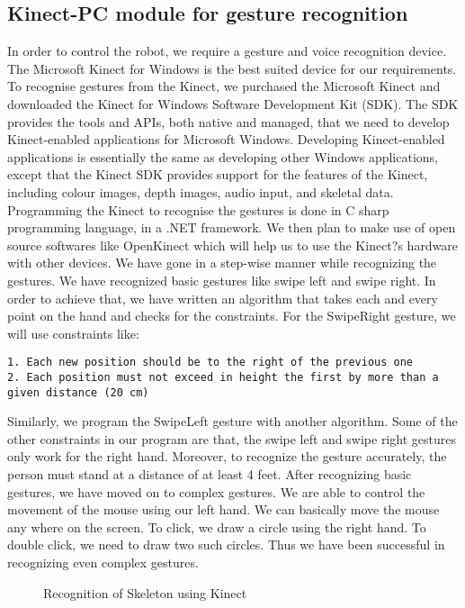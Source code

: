 \subsection{Kinect-PC module for gesture recognition}
In order to control the robot, we require a gesture and voice recognition device. The Microsoft Kinect for Windows is the best suited device for our requirements. To recognise gestures from the Kinect, we purchased the Microsoft Kinect and downloaded the Kinect for Windows Software Development Kit (SDK). The SDK provides the tools and APIs, both native and managed, that we need to develop Kinect-enabled applications for Microsoft Windows.
Developing Kinect-enabled applications is essentially the same as developing other Windows applications, except that the Kinect SDK provides support for the features of the Kinect, including colour images, depth images, audio input, and skeletal data. Programming the Kinect to recognise the gestures is done in C sharp programming language, in a .NET framework. We then plan to make use of open source softwares like OpenKinect which will help us to use the Kinect?s hardware with other devices. We have gone in a step-wise manner while recognizing the gestures. We have recognized basic gestures like swipe left and swipe right. In order to achieve that, we have written an algorithm that takes each and every point on the hand and checks for the constraints.
For the SwipeRight gesture, we will use constraints like:
\begin{verbatim}
1. Each new position should be to the right of the previous one
2. Each position must not exceed in height the first by more than a given distance (20 cm)
\end{verbatim}
Similarly, we program the SwipeLeft gesture with another algorithm. Some of the other constraints in our program are that, the swipe left and swipe right gestures only work for the right hand. Moreover, to recognize the gesture accurately, the person must stand at a distance of at least 4 feet. After recognizing basic gestures, we have moved on to complex gestures. We are able to control the movement of the mouse using our left hand. We can basically move the mouse any where on the screen. To click, we draw a circle using the right hand. To double click, we need to draw two such circles. Thus we have been successful in recognizing even complex gestures.

\begin{figure}[H]
  \centering
  \caption{Recognition of Skeleton using Kinect}
  \label{skeleton}	
\end{figure}

